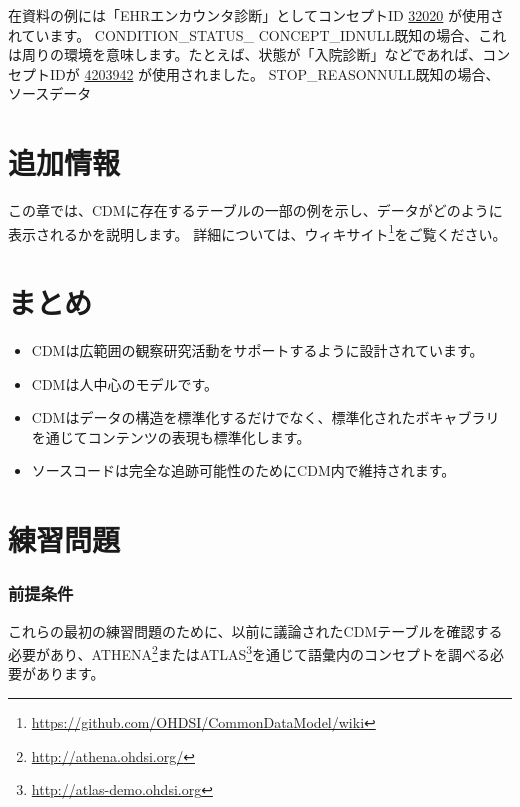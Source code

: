 \documentclass[
  11pt]{book}
\makeatletter
\newenvironment{kframe}{%
\medskip{}
\setlength{\fboxsep}{.8em}
 \def\at@end@of@kframe{}%
 \ifinner\ifhmode%
  \def\at@end@of@kframe{\end{minipage}}%
  \begin{minipage}{\columnwidth}%
 \fi\fi%
 \def\FrameCommand##1{\hskip\@totalleftmargin \hskip-\fboxsep
 \colorbox{myShadeColor}{##1}\hskip-\fboxsep
     \hskip-\linewidth \hskip-\@totalleftmargin \hskip\columnwidth}%
 \MakeFramed {\advance\hsize-\width
   \@totalleftmargin\z@ \linewidth\hsize
   \@setminipage}}%
 {\par\unskip\endMakeFramed%
 \at@end@of@kframe}
\newenvironment{rmdblock}[1]
  {
  \begin{itemize}
  \renewcommand{\labelitemi}{
    \raisebox{-.7\height}[0pt][0pt]{
      {\setkeys{Gin}{width=3em,keepaspectratio}\texttt{[image: images/\#1]}}
    }
  }
  \setlength{\fboxsep}{1em}
  \begin{kframe}
  \item
  }
  {
  \end{kframe}
  \end{itemize}
  }
\newenvironment{rmdsummary}
  {\begin{rmdblock}{summary}}
  {\end{rmdblock}}
\theoremstyle{definition}
\theoremstyle{definition}
\theoremstyle{definition}
\theoremstyle{definition}
\theoremstyle{remark}
\makeatother
\begin{document}
在資料の例には「EHRエンカウンタ診断」としてコンセプトID \href{http://athena.ohdsi.org/search-terms/terms/32020}{32020}
が使用されています。\textbar{}
\textbar CONDITION\_STATUS\_ CONCEPT\_ID\textbar NULL\textbar 既知の場合、これは周りの環境を意味します。たとえば、状態が「入院診断」などであれば、コンセプトIDが \href{http://athena.ohdsi.org/search-terms/terms/4203942}{4203942} が使用されました。\textbar{}
\textbar STOP\_REASON\textbar NULL\textbar 既知の場合、ソースデータ

\section{追加情報}\label{ux8ffdux52a0ux60c5ux5831}

この章では、CDMに存在するテーブルの一部の例を示し、データがどのように表示されるかを説明します。 詳細については、ウィキサイト\footnote{\url{https://github.com/OHDSI/CommonDataModel/wiki}}をご覧ください。

\section{まとめ}\label{ux307eux3068ux3081-2}

\begin{rmdsummary}
\begin{itemize}
\item
  CDMは広範囲の観察研究活動をサポートするように設計されています。
\item
  CDMは人中心のモデルです。
\item
  CDMはデータの構造を標準化するだけでなく、標準化されたボキャブラリを通じてコンテンツの表現も標準化します。
\item
  ソースコードは完全な追跡可能性のためにCDM内で維持されます。
\end{itemize}
\end{rmdsummary}

\section{練習問題}\label{ux7df4ux7fd2ux554fux984c}

\subsubsection*{前提条件}\label{ux524dux63d0ux6761ux4ef6}

これらの最初の練習問題のために、以前に議論されたCDMテーブルを確認する必要があり、ATHENA\footnote{\url{http://athena.ohdsi.org/}}またはATLAS\footnote{\url{http://atlas-demo.ohdsi.org}}を通じて語彙内のコンセプトを調べる必要があります。
\end{document}
